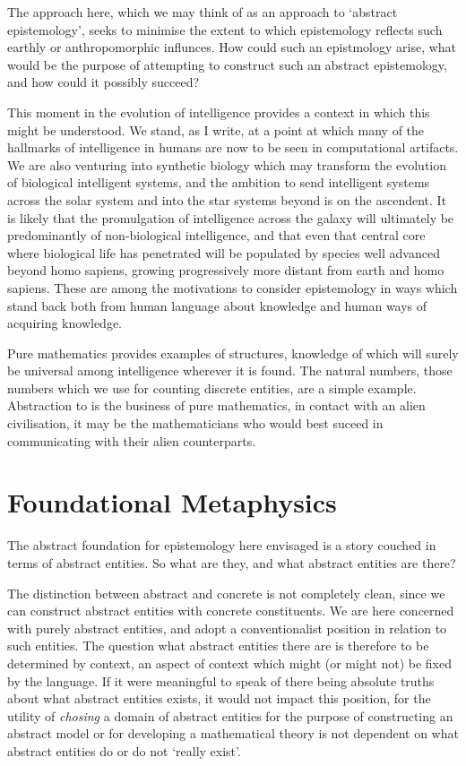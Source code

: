 The approach here, which we may think of as an approach to `abstract epistemology', seeks to minimise the extent to which epistemology reflects such earthly or anthropomorphic influnces.
How could such an epistmology arise, what would be the purpose of attempting to construct such an abstract epistemology, and how could it possibly succeed?

This moment in the evolution of intelligence provides a context in which this might be understood.
We stand, as I write, at a point at which many of the hallmarks of intelligence in humans are now to be seen in computational artifacts.
We are also venturing into synthetic biology which may transform the evolution of biological intelligent systems, and the ambition to send intelligent systems across the solar system and into the star systems beyond is on the ascendent.
It is likely that the promulgation of intelligence across the galaxy will ultimately be predominantly of non-biological intelligence, and that even that central core where biological life has penetrated will be populated by species well advanced beyond homo sapiens, growing progressively more distant from earth and homo sapiens.
These are among the motivations to consider epistemology in ways which stand back both from human language about knowledge and human ways of acquiring knowledge.

Pure mathematics provides examples of structures, knowledge of which will surely be universal among intelligence wherever it is found.
The natural numbers, those numbers which we use for counting discrete entities, are a simple example.
Abstraction to is the business of pure mathematics, in contact with an alien civilisation, it may be the mathematicians who would best suceed in communicating with their alien counterparts.

\section{Foundational Metaphysics}

The abstract foundation for epistemology here envisaged is a story couched in terms of abstract entities.
So what are they, and what abstract entities are there?

The distinction between abstract and concrete is not completely clean, since we can construct abstract entities with concrete constituents.
We are here concerned with purely abstract entities, and adopt a conventionalist position in relation to such entities.
The question what abstract entities there are is therefore to be determined by context, an aspect of context which might (or might not) be fixed by the language.
If it were meaningful to speak of there being absolute truths about what abstract entities exists, it would not impact this position, for the utility of \emph{chosing} a domain of abstract entities for the purpose of constructing an abstract model or for developing a mathematical theory is not dependent on what abstract entities do or do not `really exist'.

